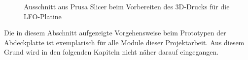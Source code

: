 \begin{figure}[h]
	\centering
	\setlength{\fboxsep}{1pt} %
	\setlength{\fboxrule}{1pt} %
	\caption{Ausschnitt aus \grqq{}Prusa Slicer\grqq{} beim Vorbereiten des 3D-Drucks für die LFO-Platine}
	\label{fig:3DDruck_LFO}
\end{figure}
\FloatBarrier

Die in diesem Abschnitt aufgezeigte Vorgehensweise beim Prototypen der Abdeckplatte ist exemplarisch für alle Module dieser Projektarbeit. Aus diesem Grund wird in den folgenden Kapiteln nicht näher darauf eingegangen.